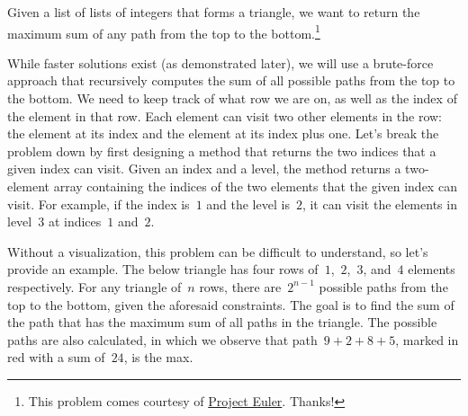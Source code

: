 Given a list of lists of integers that forms a triangle, we want to return the maximum sum of any path from the top to the bottom.\footnote{This problem comes courtesy of \href{https://projecteuler.net/problem=18}{Project Euler}. Thanks!}

While faster solutions exist (as demonstrated later), we will use a brute-force approach that recursively computes the sum of all possible paths from the top to the bottom.
We need to keep track of what row we are on, as well as the index of the element in that row.
Each element can visit two other elements in the row: the element at its index and the element at its index plus one.
Let's break the problem down by first designing a method that returns the two indices that a given index can visit.
Given an index and a level, the  method returns a two-element array containing the indices of the two elements that the given index can visit.
For example, if the index is~$1$ and the level is~$2$, it can visit the elements in level~$3$ at indices~$1$ and~$2$.

Without a visualization, this problem can be difficult to understand, so let's provide an example.
The below triangle has four rows of~$1$,~$2$,~$3$, and~$4$ elements respectively. For any triangle of~$n$ rows, there are~$2^{n-1}$ possible paths from the top to the bottom, given the aforesaid constraints.
The goal is to find the sum of the path that has the maximum sum of all paths in the triangle.
The possible paths are also calculated, in which we observe that path~$9+2+8+5$, marked in red with a sum of~$24$, is the max.

